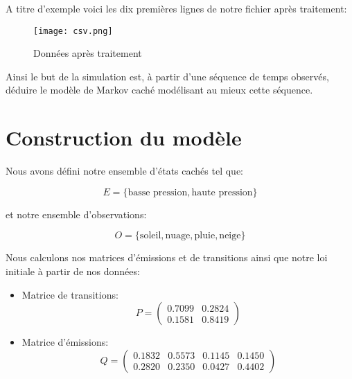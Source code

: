 \documentclass{article}
\begin{document}
\begin{multicols}{2}
A titre d'exemple voici les dix premières lignes de notre fichier après
traitement:

\begin{figure}[H]
    \begin{center}
        \texttt{[image: csv.png]}
        \centering
        \captionsetup{justification=centering}
        \caption{\label{fig:empiricalHmm}Données après traitement}
    \end{center}
\end{figure}

Ainsi le but de la simulation est, à partir d'une séquence de temps observés,
déduire le modèle de Markov caché modélisant au mieux cette séquence.

\section{Construction du modèle}\label{sec:construct}

Nous avons défini notre ensemble d'états cachés tel que:

\begin{equation}
    E = \{\text{basse pression}, \text{haute pression}\}
\end{equation}

et notre ensemble d'observations:

\begin{equation}
    O = \{\text{soleil}, \text{nuage}, \text{pluie}, \text{neige}\}
\end{equation}

Nous calculons nos matrices d'émissions et de transitions ainsi que notre loi
initiale à partir de nos données:

\begin{itemize}
    \item Matrice de transitions:
        \begin{equation}\label{eq:trans}
            P =
            \begin{pmatrix*}
                0.7099 & 0.2824 \\
                0.1581 & 0.8419
            \end{pmatrix*}
        \end{equation}

    \item Matrice d'émissions:
        \begin{equation}\label{eq:emis}
            Q =
            \begin{pmatrix*}
                0.1832 & 0.5573 & 0.1145 & 0.1450 \\
                0.2820 & 0.2350 & 0.0427 & 0.4402
            \end{pmatrix*}
        \end{equation}


\end{itemize}
\end{multicols}
\end{document}
